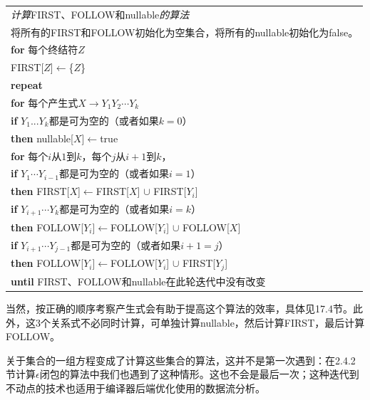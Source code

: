 \documentclass[cn,11pt,chinese]{elegantbook}
\begin{document}
\begin{tabular}{l}
\toprule
\textit{计算}FIRST、FOLLOW和nullable\textit{的算法}\\
将所有的FIRST和FOLLOW初始化为空集合，将所有的nullable初始化为false。\\
\textbf{for} 每个终结符$Z$\\
\indent FIRST[$Z$]$\leftarrow$\{$Z$\} \\
\textbf{repeat}
\\
\indent\textbf{for} 每个产生式$X \rightarrow Y_1Y_2\cdots Y_k$
\\
\indent\indent\textbf{if} $Y_1...Y_k$都是可为空的（或者如果$k=0$）
\\
\indent\indent\indent\textbf{then} nullable[$X$]$\leftarrow$true
\\
\indent\indent\textbf{for} 每个$i$从$1$到$k$，每个$j$从$i+1$到$k$，
\\
\indent\indent\indent\textbf{if} $Y_1\cdots Y_{i-1}$都是可为空的（或者如果$i=1$）
\\
\indent\indent\indent\indent\textbf{then} FIRST[$X$]$\leftarrow$FIRST[$X$] $\cup$ FIRST[$Y_i$]
\\
\indent\indent\indent\textbf{if} $Y_{i+1}\cdots Y_{k}$都是可为空的（或者如果$i=k$）
\\
\indent\indent\indent\indent\textbf{then} FOLLOW[$Y_i$]$\leftarrow$FOLLOW[$Y_i$] $\cup$ FOLLOW[$X$]
\\
\indent\indent\indent\textbf{if} $Y_{i+1}\cdots Y_{j-1}$都是可为空的（或者如果$i+1=j$）
\\
\indent\indent\indent\indent\textbf{then} FOLLOW[$Y_i$]$\leftarrow$FOLLOW[$Y_i$] $\cup$ FIRST[$Y_j$]
\\
\textbf{until} FIRST、FOLLOW和nullable在此轮迭代中没有改变
\\
\bottomrule
\end{tabular}

当然，按正确的顺序考察产生式会有助于提高这个算法的效率，具体见17.4节。此外，这3个关系式不必同时计算，可单独计算nullable，然后计算FIRST，最后计算FOLLOW。

关于集合的一组方程变成了计算这些集合的算法，这并不是第一次遇到：在2.4.2节计算$\epsilon$闭包的算法中我们也遇到了这种情形。这也不会是最后一次；这种迭代到不动点的技术也适用于编译器后端优化使用的数据流分析。
\end{document}
